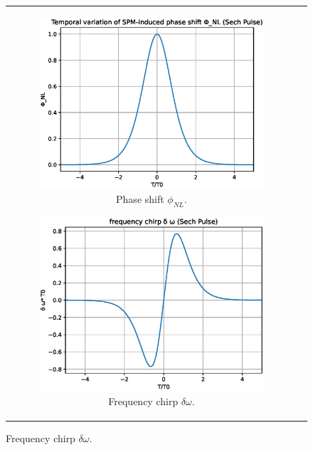          \begin{figure}[label={fig:spmsech}, caption={Effect of SPM in a Sech pulse.}]
         \centering
        \begin{tabular}[c]{cc}
        \centering
        \begin{subfigure}[b]{.53\textwidth}
		    \centering	
            \includegraphics[width=1\textwidth]{figures/chap3/shift_sech.eps}
            \caption{Phase shift $\phi_{NL}$.}
            \label{fig:shift}
        \end{subfigure}
        \hfill
        \begin{subfigure}[b]{.53\textwidth}
		    \centering	
            \includegraphics[width=1\textwidth]{figures/chap3/chirp_sech.eps}
            \caption{Frequency chirp $\delta \omega$.}
            \label{fig:chirp}
        \end{subfigure}
        \end{tabular}
        \end{figure}
        
